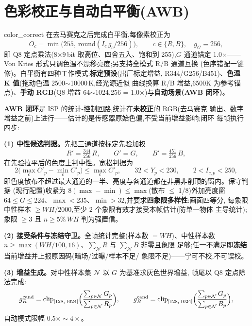 \section{色彩校正与自动白平衡(AWB)}

color\_correct 在去马赛克之后完成白平衡,每像素校正为
\begin{equation*}
O_c=\min\bigl(255,\ \mathrm{round}(I_c\,g_c/256)\bigr),\qquad c\in\{R,B\},\quad g_G\equiv 256,
\end{equation*}
即 Q8 定点乘法(8$\times$9\,bit 取高位、四舍五入、饱和到 255),$G$ 通道锚定
1.0$\times$——Von Kries 形式只调色温不漂移亮度;另支持全模式 R/B 通道互换
(色序错配一键修)。白平衡有四种工作模式:\textbf{标定预设}(出厂标定增益,
R344/G256/B451)、\textbf{色温 K 值}(拖动色温 2500$\sim$10000\,K,经光源近似
曲线换算 R/B 增益,6500K 为参考锚点)、\textbf{手动 RGB}(Q8 增益
64$\sim$1024,256 = 1.0$\times$)与\textbf{自动场景(AWB 闭环)}。

\textbf{AWB 闭环}是 ISP 的统计-控制回路,统计在\textbf{未校正}的 RGB(去马赛克
输出、数字增益之前)上进行——估计的是传感器原始色偏,不受当前增益影响;闭环
每帧执行四步:

\textbf{(1) 中性候选判据。}先把三通道按标定先验加权
\begin{equation*}
R'=\tfrac{344}{256}\,R,\qquad G'=G,\qquad B'=\tfrac{451}{256}\,B,
\end{equation*}
在先验拉平后的色度上判中性。宽松判据为
\begin{equation*}
2\bigl(\max_c C'_p-\min_c C'_p\bigr)\le\max_c C'_p,\qquad
32<Y_p<230,\qquad 2<I_{c,p}<250,
\end{equation*}
即色度散布不超过最大通道的一半、亮度与各通道都在非黑非削顶的窗内。保守判据
(现行配置)收紧为 $8(\max-\min)\le\max$(散布 $\le$ 1/8)外加亮度窗
$64\le G\le224$、$\max<235$、$\min>32$,并要求\textbf{四象限多样性}:画面四等分,
每象限中性样本 $\ge WH/2000$,至少 2 个象限有效才接受本帧估计(防单一物体
主导统计);象限 $\ge$3 且 $n\ge 5\%\,WH$ 判为强置信。

\textbf{(2) 接受条件与冻结守卫。}全帧统计完整(样本数 $=WH$)、中性样本数
$n\ge\max(WH/100,16)$、$\sum_{\mathcal N}R$ 与 $\sum_{\mathcal N}B$ 非零且象限
足够;任一不满足即\textbf{冻结}当前增益并上报原因码(暗场/过曝/样本不足/
象限不足)——宁可不校,不可误校。

\textbf{(3) 增益生成。}对中性样本集 $\mathcal N$ 以 $G$ 为基准求灰色世界增益,
帧尾以 Q8 定点除法完成:
\begin{equation*}
g_R^{\mathrm{cand}}=\mathrm{clip}_{[128,\,1024]}\Bigl(\frac{\sum_{p\in\mathcal N}G_p}{\sum_{p\in\mathcal N}R_p}\Bigr),\qquad
g_B^{\mathrm{cand}}=\mathrm{clip}_{[128,\,1024]}\Bigl(\frac{\sum_{p\in\mathcal N}G_p}{\sum_{p\in\mathcal N}B_p}\Bigr),
\end{equation*}
自动模式限幅 $0.5\times\sim4\times$。


